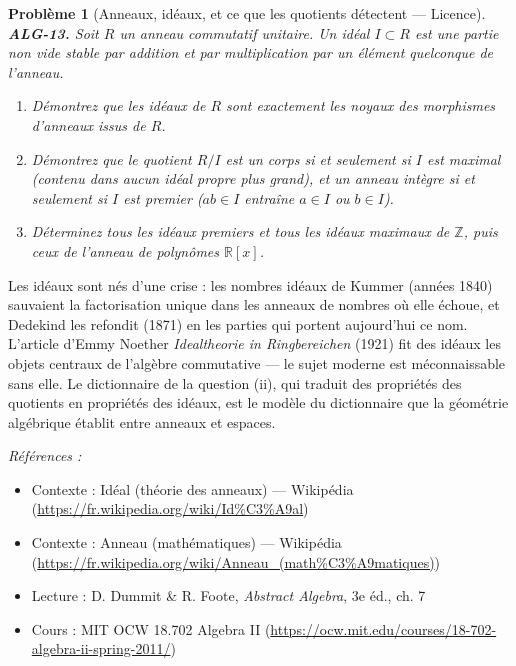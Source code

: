\documentclass[11pt]{article}
\newtheorem{problem}{Problème}
\newenvironment{refs}{\par\small\noindent\emph{Références :}\begin{itemize}\setlength\itemsep{0pt}}{\end{itemize}\normalsize}
\begin{document}
\begin{problem}[{Anneaux, idéaux, et ce que les quotients détectent --- Licence}]
\textbf{ALG-13.} Soit $R$ un anneau commutatif unitaire. Un \textit{idéal}
$I \subset R$ est une partie non vide stable par addition et par multiplication par un élément
quelconque de l'anneau.
\begin{enumerate}
\item[(i)] Démontrez que les idéaux de $R$ sont exactement les noyaux des morphismes
d'anneaux issus de $R$.
\item[(ii)] Démontrez que le quotient $R/I$ est un corps si et seulement si $I$ est maximal
(contenu dans aucun idéal propre plus grand), et un anneau intègre si et seulement si $I$ est premier
($ab \in I$ entraîne $a \in I$ ou $b \in I$).
\item[(iii)] Déterminez tous les idéaux premiers et tous les idéaux
maximaux de $\mathbb{Z}$, puis ceux de l'anneau de polynômes $\mathbb{R}[x]$.
\end{enumerate}

\end{problem}

\noindent Les idéaux sont nés d'une crise : les \og{} nombres idéaux \fg{} de Kummer (années 1840)
sauvaient la factorisation unique dans les anneaux de nombres où elle échoue, et Dedekind les refondit (1871)
en les parties qui portent aujourd'hui ce nom. L'article d'Emmy Noether \textit{Idealtheorie in Ringbereichen}
(1921) fit des idéaux les objets centraux de l'algèbre commutative --- le sujet moderne est méconnaissable sans
elle. Le dictionnaire de la question (ii), qui traduit des propriétés des quotients en propriétés des idéaux,
est le modèle du dictionnaire que la géométrie algébrique établit entre anneaux et espaces.

\begin{refs}
\item Contexte : Idéal (théorie des anneaux) --- Wikipédia (\url{https://fr.wikipedia.org/wiki/Id%C3%A9al})
\item Contexte : Anneau (mathématiques) --- Wikipédia (\url{https://fr.wikipedia.org/wiki/Anneau_(math%C3%A9matiques)})
\item Lecture : D. Dummit \& R. Foote, \textit{Abstract Algebra}, 3e éd., ch. 7
\item Cours : MIT OCW 18.702 Algebra II (\url{https://ocw.mit.edu/courses/18-702-algebra-ii-spring-2011/})
\end{refs}

\bigskip
\end{document}
